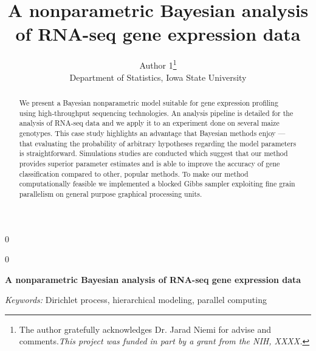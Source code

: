 \documentclass[12pt]{article}
\newcommand{\blind}{0}
\begin{document}
\newtoggle{thesis}
\togglefalse{thesis}
% 

\def\spacingset#1{\renewcommand{\baselinestretch}%
{#1}\small\normalsize} \spacingset{1}



\blind
{
  \title{\bf A nonparametric Bayesian analysis of RNA-seq gene expression data}
  \author{Author 1\thanks{
    The author gratefully acknowledges Dr. Jarad Niemi for advise and comments.\textit{This project was funded in part by a grant from the NIH, XXXX.}}\hspace{.2cm}\\
    Department of Statistics, Iowa State University}
  \maketitle
} \fi

\blind
{
  \bigskip
  \bigskip
  \bigskip
  \begin{center}
    {\LARGE\bf A nonparametric Bayesian analysis of RNA-seq gene expression data}
\end{center}
  \medskip
} \fi

\bigskip
\begin{abstract}
We present a Bayesian nonparametric model suitable for gene expression profiling using high-throughput sequencing technologies. An analysis pipeline is detailed for the analysis of RNA-seq data and we apply it to an experiment done on several maize genotypes. This case study highlights an advantage that Bayesian methods enjoy --- that evaluating the probability of arbitrary hypotheses regarding the model parameters is straightforward. Simulations studies are conducted which suggest that our method provides superior parameter estimates and is able to improve the accuracy of gene classification compared to other, popular methods. To make our method computationally feasible we implemented a blocked Gibbs sampler exploiting fine grain parallelism on general purpose graphical processing units.

\end{abstract}

\noindent%
{\it Keywords:}  Dirichlet process, hierarchical modeling, parallel computing
\vfill

\newpage
\tableofcontents

\spacingset{1.45} %


\end{document}
